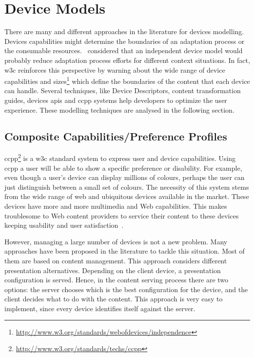
\section{Device Models}
\label{sec:devices}

There are many and different approaches in the literature for devices modelling.
Devices capabilities might determine the boundaries of an adaptation process or
the consumable resources.~\citet{lemlouma_context_aware_2004} considered that
an independent device model would probably reduce adaptation process efforts for
different context situations. In fact, \ac{w3c} reinforces this perspective
by warning about the wide range of device capabilities and 
sizes\footnote{\url{http://www.w3.org/standards/webofdevices/independence}} which define the boundaries of the content
that each device can handle. Several techniques, like Device Descriptors, content
transformation guides, devices \acp{api} and \ac{ccpp} systems help developers 
to optimize the user experience. These modelling techniques are analysed in the 
following section. 

\subsection{Composite Capabilities/Preference Profiles}
\label{sec:ccpp}
\ac{ccpp}\footnote{\url{http://www.w3.org/standards/techs/ccpp}} is a \ac{w3c} standard system to express user and 
device capabilities. Using \ac{ccpp} a user will be able to show a specific 
preference or disability. For example, even though a user's device can display 
millions of colours, perhaps the user can just distinguish between a small set 
of colours. The necessity of this system stems from the wide range of web and 
ubiquitous devices available in the market. These devices have more and more 
multimedia and Web capabilities. This makes troublesome to Web content providers 
to service their content to these devices keeping usability and user 
satisfaction~\citep{lemlouma_context_aware_2004}. 

However, managing a large number of devices is not a new problem. Many approaches 
have been proposed in the literature to tackle this situation. Most of them are 
based on content management. This approach considers different presentation 
alternatives. Depending on the client device, a presentation configuration is 
served. Hence, in the content serving process there are two options: the 
server chooses which is the best configuration for the device, and the client 
decides what to do with the content. This approach is very easy to implement, 
since every device identifies itself against the server.

